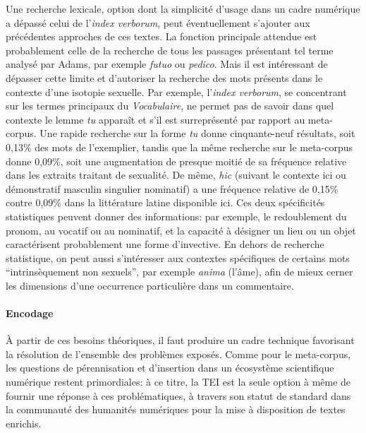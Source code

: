 Une recherche lexicale, option dont la simplicité d'usage dans un cadre numérique a dépassé celui de l'\textit{index verborum}, peut éventuellement s'ajouter aux précédentes approches de ces textes. La fonction principale attendue est probablement celle de la recherche de tous les passages présentant tel terme analysé par Adams, par exemple \textit{futuo} ou \textit{pedico}. Mais il est intéressant de dépasser cette limite et d'autoriser la recherche des mots présents dans le contexte d'une isotopie sexuelle. Par exemple, l'\textit{index verborum}, se concentrant sur les termes principaux du \textit{Vocabulaire}, ne permet pas de savoir dans quel contexte le lemme \textit{tu} apparaît et s'il est surreprésenté par rapport au meta-corpus. Une rapide recherche sur la forme \textit{tu} donne cinquante-neuf résultats, soit 0,13\% des mots de l'exemplier, tandis que la même recherche sur le meta-corpus donne 0,09\%, soit une augmentation de presque moitié de sa fréquence relative dans les extraits traitant de sexualité. De même, \textit{hic} (suivant le contexte ici ou démonstratif masculin singulier nominatif) a une fréquence relative de 0,15\% contre 0,09\% dans la littérature latine disponible ici. Ces deux spécificités statistiques peuvent donner des informations: par exemple, le redoublement du pronom, au vocatif ou au nominatif, et la capacité à désigner un lieu ou un objet caractérisent probablement une forme d'invective. En dehors de recherche statistique, on peut aussi s'intéresser aux contextes spécifiques de certains mots \enquote{intrinsèquement non sexuels}, par exemple \textit{anima} (l'âme), afin de mieux cerner les dimensions d'une occurrence particulière dans un commentaire.

\paragraph{Encodage}

À partir de ces besoins théoriques, il faut produire un cadre technique favorisant la résolution de l'ensemble des problèmes exposés. Comme pour le meta-corpus, les questions de pérennisation et d'insertion dans un écosystème scientifique numérique restent primordiales: à ce titre, la TEI est la seule option à même de fournir une réponse à ces problématiques, à travers son statut de standard dans la communauté des humanités numériques pour la mise à disposition de textes enrichis.

